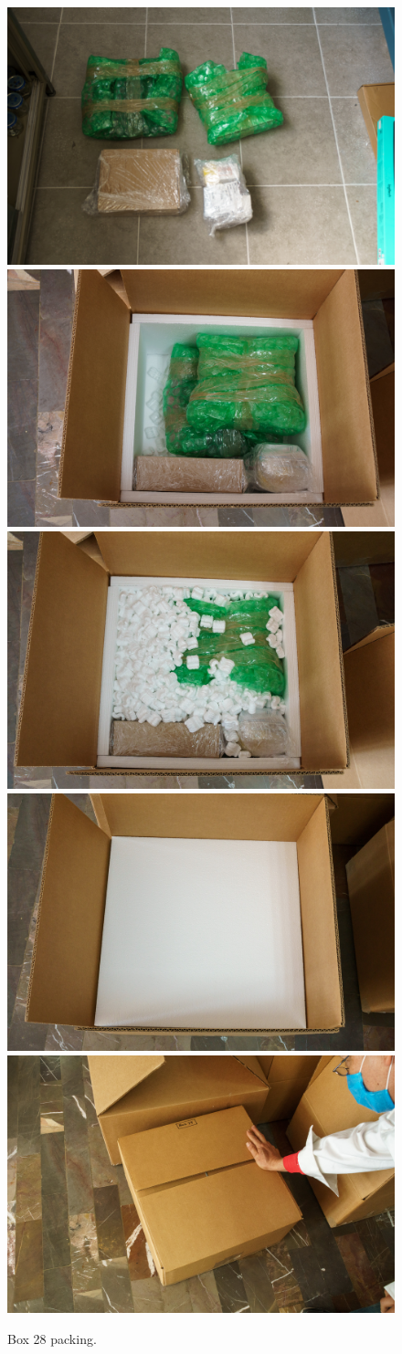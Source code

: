 \documentclass{article}
\begin{document}
\begin{figure}[bp]
\begin{center}
\includegraphics[width=0.40\linewidth]{figures/20201209T140919.jpg}
\includegraphics[width=0.40\linewidth]{figures/20201209T142113.jpg}\\[\smallskipamount]
\includegraphics[width=0.40\linewidth]{figures/20201209T142229.jpg}
\includegraphics[width=0.40\linewidth]{figures/20201209T142335.jpg}\\[\smallskipamount]
\includegraphics[width=0.40\linewidth]{figures/20201209T142403.jpg}
\end{center}
\caption{Box 28 packing.}
\label{figure:box-twenty-eight-packing}
\end{figure}
\end{document}
